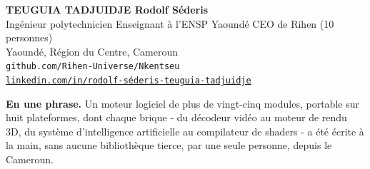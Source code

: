 \documentclass[11pt, a4paper, oneside]{article}
\begin{document}

\vspace*{5.6cm}

\begin{center}
{\Large\bfseries TEUGUIA TADJUIDJE Rodolf Séderis}\\[3pt]
{\color{grisTexte} Ingénieur polytechnicien \textbullet{} Enseignant à l'ENSP Yaoundé
\textbullet{} CEO de Rihen (10 personnes)}\\[1pt]
{\color{grisTexte} Yaoundé, Région du Centre, Cameroun}\\[3pt]
\texttt{\small github.com/Rihen-Universe/Nkentseu}\\[1pt]
\href{https://www.linkedin.com/in/rodolf-s\%C3\%A9deris-teuguia-tadjuidje-1787b1153/}%
{\texttt{\small linkedin.com/in/rodolf-séderis-teuguia-tadjuidje}}
\end{center}

\vspace{10pt}

\noindent\colorbox{rihenPale}{\parbox{\dimexpr\textwidth-2\fboxsep}{\vspace{2pt}
\textbf{En une phrase.} Un moteur logiciel de plus de vingt-cinq modules, portable
sur huit plateformes, dont chaque brique - du décodeur vidéo au moteur de rendu 3D,
du système d'intelligence artificielle au compilateur de shaders - a été écrite à
la main, sans aucune bibliothèque tierce, par une seule personne, depuis le
Cameroun.\vspace{2pt}}}
\end{document}
